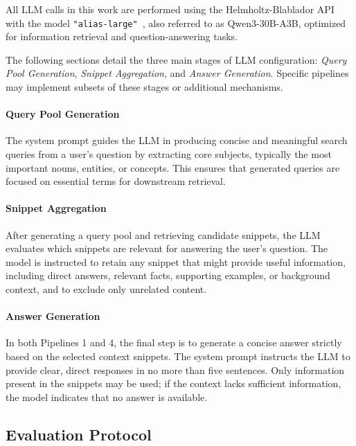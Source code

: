 \documentclass[manuscript,screen]{acmart}
\begin{document}
\begin{CCSXML}
	All LLM calls in this work are performed using the Helmholtz-Blablador API~\cite{blablador_api} with the model \texttt{"alias-large"}~\cite{qwen3_model}, also referred to as Qwen3-30B-A3B, optimized for information retrieval and question-answering tasks.
	
	The following sections detail the three main stages of LLM configuration: \textit{Query Pool Generation}, \textit{Snippet Aggregation}, and \textit{Answer Generation}. Specific pipelines may implement subsets of these stages or additional mechanisms.
	
		\paragraph{Query Pool Generation}
		\label{subsubsec:query-pool-generation}
		
		The system prompt guides the LLM in producing concise and meaningful search queries from a user's question by extracting core subjects, typically the most important nouns, entities, or concepts. This ensures that generated queries are focused on essential terms for downstream retrieval.
		
		\paragraph{Snippet Aggregation}
		\label{subsubsec:snippet-aggregation}
		
		After generating a query pool and retrieving candidate snippets, the LLM evaluates which snippets are relevant for answering the user's question. The model is instructed to retain any snippet that might provide useful information, including direct answers, relevant facts, supporting examples, or background context, and to exclude only unrelated content.
		
		\paragraph{Answer Generation}
		\label{subsubsec:answer-generation}
		
		In both Pipelines 1 and 4, the final step is to generate a concise answer strictly based on the selected context snippets. The system prompt instructs the LLM to provide clear, direct responses in no more than five sentences. Only information present in the snippets may be used; if the context lacks sufficient information, the model indicates that no answer is available.
	
	
	\subsection{Evaluation Protocol}
	\label{subsec:evaluation-protocol}
	

\end{CCSXML}
\end{document}
